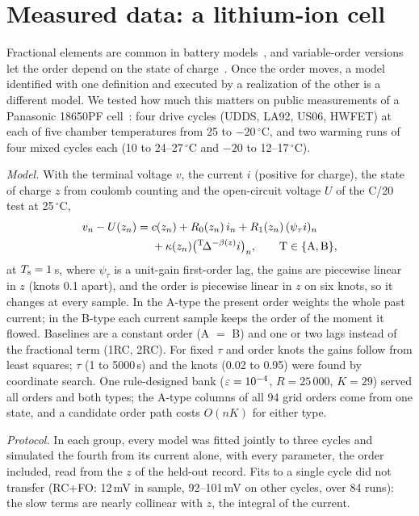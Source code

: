 \section{Measured data: a lithium-ion cell}\label{sec:battery}

Fractional elements are common in battery models~\cite{zou2018review}, and variable-order versions let the order depend on the state of charge~\cite{lu2018energies,wang2022symmetry,mao2023est}. Once the order moves, a model identified with one definition and executed by a realization of the other is a different model. We tested how much this matters on public measurements of a Panasonic 18650PF cell~\cite{kollmeyer2018data}: four drive cycles (UDDS, LA92, US06, HWFET) at each of five chamber temperatures from 25 to $-20\,^\circ$C, and two warming runs of four mixed cycles each (10 to 24--27\,$^\circ$C and $-20$ to 12--17\,$^\circ$C).

\emph{Model.} With the terminal voltage $v$, the current $i$ (positive for charge), the state of charge $z$ from coulomb counting and the open-circuit voltage $U$ of the C/20 test at 25\,$^\circ$C,
\begin{equation}
\begin{aligned}
v_n-U(z_n)={}&c(z_n)+R_0(z_n)\,i_n+R_1(z_n)\,(\psi_\tau i)_n\\
&+\kappa(z_n)\big({}^{\mathrm{T}}\!\Delta^{-\beta(z)}i\big)_n,\qquad \mathrm T\in\{\mathrm A,\mathrm B\},
\end{aligned}\label{eq:battery}
\end{equation}
at $T_{\mathrm{s}}=1$\,s, where $\psi_\tau$ is a unit-gain first-order lag, the gains are piecewise linear in $z$ (knots 0.1 apart), and the order is piecewise linear in $z$ on six knots, so it changes at every sample. In the A-type the present order weights the whole past current; in the B-type each current sample keeps the order of the moment it flowed. Baselines are a constant order (A $=$ B) and one or two lags instead of the fractional term (1RC, 2RC). For fixed $\tau$ and order knots the gains follow from least squares; $\tau$ (1 to 5000\,s) and the knots (0.02 to 0.95) were found by coordinate search. One rule-designed bank ($\varepsilon=10^{-4}$, $R=25\,000$, $K=29$) served all orders and both types; the A-type columns of all 94 grid orders come from one state, and a candidate order path costs $O(nK)$ for either type.

\emph{Protocol.} In each group, every model was fitted jointly to three cycles and simulated the fourth from its current alone, with every parameter, the order included, read from the $z$ of the held-out record. Fits to a single cycle did not transfer (RC+FO: 12\,mV in sample, 92--101\,mV on other cycles, over 84 runs): the slow terms are nearly collinear with $z$, the integral of the current.

